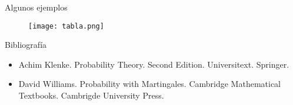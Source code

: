 \documentclass{beamer}
\begin{document}
\begin{frame}{Algunos ejemplos }
	\begin{figure}[h!] %
		\centering %
		\texttt{[image: tabla.png]}
	\end{figure}
\end{frame}

\begin{frame}{Bibliografía}
	\begin{itemize}
		\item Achim Klenke. Probability Theory. Second Edition. Universitext. Springer.
		
		\item David Williams. Probability with Martingales. Cambridge Mathematical Textbooks. Cambrigde University Press.
		
	\end{itemize}
\end{frame}
\end{document}
